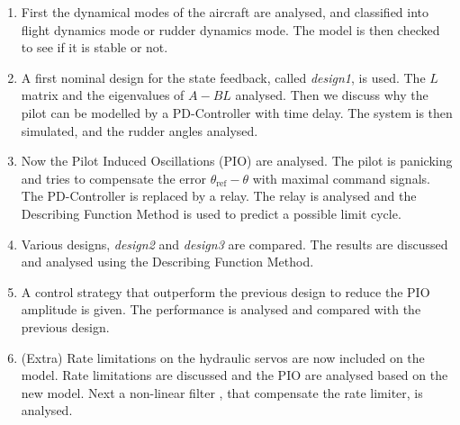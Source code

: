 \begin{enumerate}
\item{First the dynamical modes of the aircraft are analysed, and classified into flight dynamics mode or rudder dynamics mode. The model is then checked to see if it is stable or not.}
\item {A first nominal design for the state feedback, called \emph{design1}, is used. The $L$ matrix  and the eigenvalues of $A-BL$ analysed. Then we discuss why the pilot can be modelled by a PD-Controller with time delay. The system is then simulated, and the rudder angles analysed.}
\item{Now the Pilot Induced Oscillations (PIO) are analysed. The pilot is panicking and tries to compensate the error $\theta_{\text{ref}}-\theta$ with maximal command signals. The PD-Controller is replaced by a relay. The relay is analysed and the Describing Function Method is used to predict a possible limit cycle.} 
\item{Various designs, \emph{design2} and \emph{design3} are compared. The results are discussed and analysed using the Describing Function Method.}
\item{A control strategy that outperform the previous design to reduce the PIO amplitude is given. The performance is analysed and compared with the previous design}.
\item{(Extra) Rate limitations on the hydraulic servos are now included on the model. Rate limitations are discussed and the PIO are analysed based on the new model. Next a non-linear filter \cite{paper3}, that compensate the rate limiter, is analysed.}
\end{enumerate}